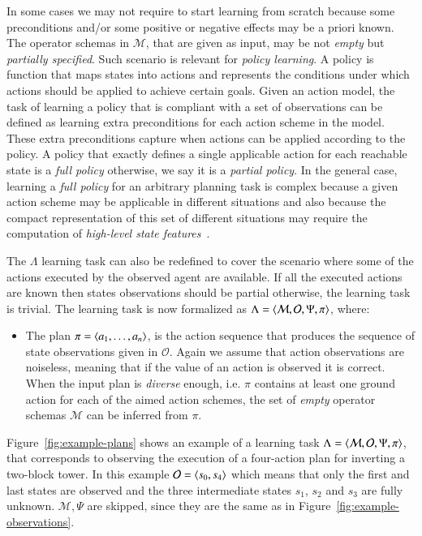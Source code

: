 In some cases we may not require to start learning from scratch because some preconditions and/or some positive or negative effects may be a priori known. The operator schemas in $\mathcal{M}$, that are given as input, may be not {\em empty} but {\em partially specified}. Such scenario is relevant for {\em policy learning}. A policy is function that maps states into actions and represents the conditions under which actions should be applied to achieve certain goals. Given an action model, the task of learning a policy that is compliant with a set of observations can be defined as learning extra preconditions for each action scheme in the model. These extra preconditions capture when actions can be applied according to the policy. A policy that exactly defines a single applicable action for each reachable state is a {\em full policy} otherwise, we say it is a {\em partial policy}. In the general case, learning a {\em full policy} for an arbitrary planning task is complex because a given action scheme may be applicable in different situations and also because the compact representation of this set of different situations may require the computation of {\em high-level state features}~\cite{lotinac2016automatic}.

The $\Lambda$ learning task can also be redefined to cover the scenario where some of the actions executed by the observed agent are available. If all the executed actions are known then states observations should be partial otherwise, the learning task is trivial. The learning task is now formalized as $\Lambda={\langle \mathcal{M},\mathcal{O},\Psi,\pi \rangle}$, where:
\begin{itemize}
\item The plan $\pi={\langle a_1, \ldots, a_n \rangle}$, is the action sequence that produces the sequence of state observations given in $\mathcal{O}$. Again we assume that action observations are noiseless, meaning that if the value of an action is observed it is correct. When the input plan is {\em diverse} enough, i.e. $\pi$ contains at least one ground action for each of the aimed action schemes, the set of {\em empty} operator schemas $\mathcal{M}$ can be inferred from $\pi$.
\end{itemize}

Figure~\ref{fig:example-plans} shows an example of a learning task $\Lambda={\langle \mathcal{M},\mathcal{O},\Psi,\pi \rangle}$, that corresponds to observing the execution of a four-action plan for inverting a two-block tower. In this example $\mathcal{O}={\langle s_0,s_4 \rangle}$ which means that only the first and last states are observed and the three intermediate states $s_1$, $s_2$ and $s_3$ are fully unknown. $\mathcal{M},\Psi$ are skipped, since they are the same as in Figure~\ref{fig:example-observations}.

